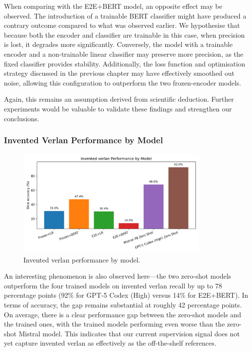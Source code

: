 \documentclass[12pt]{article}
\begin{document}
When comparing with the E2E+BERT model, an opposite effect may be observed. 
The introduction of a trainable BERT classifier might have produced a contrary outcome compared to what was observed earlier. 
We hypothesise that because both the encoder and classifier are trainable in this case, when precision is lost, it degrades more significantly. 
Conversely, the model with a trainable encoder and a non-trainable linear classifier may preserve more precision, as the fixed classifier provides stability. 
Additionally, the loss function and optimisation strategy discussed in the previous chapter may have effectively smoothed out noise, allowing this configuration to outperform the two frozen-encoder models.

Again, this remains an assumption derived from scientific deduction. 
Further experiments would be valuable to validate these findings and strengthen our conclusions.

\subsubsection{Invented Verlan Performance by Model}

\begin{figure}[htbp]
    \centering
    \includegraphics[width=0.85\textwidth]{figures/invented_verlan_comparison.png}
    \caption{Invented verlan performance by model.}
    \label{fig:invented-verlan-comparison}
\end{figure}

An interesting phenomenon is also observed here\;---\;the two zero-shot models outperform the four trained models on invented verlan recall by up to 78 percentage points (92\% for GPT-5 Codex (High) versus 14\% for E2E+BERT). 
In terms of accuracy, the gap remains substantial at roughly 42 percentage points.
On average, there is a clear performance gap between the zero-shot models and the trained ones, with the trained models performing even worse than the zero-shot Mistral model. This indicates that our current supervision signal does not yet capture invented verlan as effectively as the off-the-shelf references.
\end{document}
